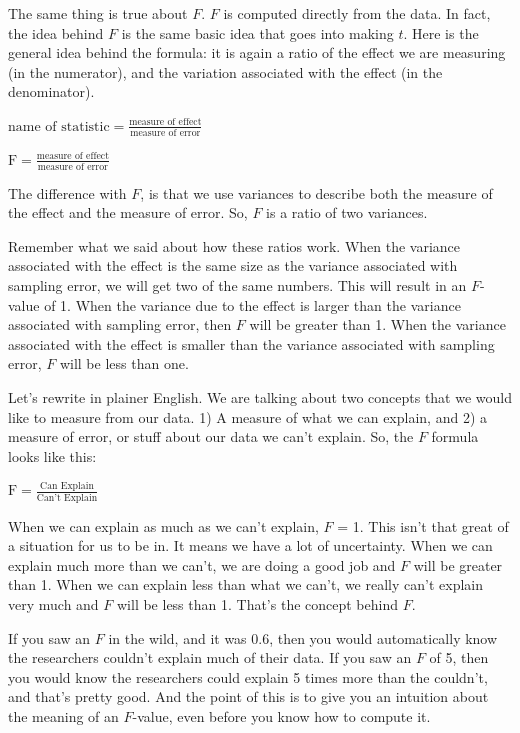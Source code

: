 \documentclass[
]{book}
\begin{document}
The same thing is true about \(F\). \(F\) is computed directly from the data. In fact, the idea behind \(F\) is the same basic idea that goes into making \(t\). Here is the general idea behind the formula: it is again a ratio of the effect we are measuring (in the numerator), and the variation associated with the effect (in the denominator).

\(\text{name of statistic} = \frac{\text{measure of effect}}{\text{measure of error}}\)

\(\text{F} = \frac{\text{measure of effect}}{\text{measure of error}}\)

The difference with \(F\), is that we use variances to describe both the measure of the effect and the measure of error. So, \(F\) is a ratio of two variances.

Remember what we said about how these ratios work. When the variance associated with the effect is the same size as the variance associated with sampling error, we will get two of the same numbers. This will result in an \(F\)-value of 1. When the variance due to the effect is larger than the variance associated with sampling error, then \(F\) will be greater than 1. When the variance associated with the effect is smaller than the variance associated with sampling error, \(F\) will be less than one.

Let's rewrite in plainer English. We are talking about two concepts that we would like to measure from our data. 1) A measure of what we can explain, and 2) a measure of error, or stuff about our data we can't explain. So, the \(F\) formula looks like this:

\(\text{F} = \frac{\text{Can Explain}}{\text{Can't Explain}}\)

When we can explain as much as we can't explain, \(F\) = 1. This isn't that great of a situation for us to be in. It means we have a lot of uncertainty. When we can explain much more than we can't, we are doing a good job and \(F\) will be greater than 1. When we can explain less than what we can't, we really can't explain very much and \(F\) will be less than 1. That's the concept behind \(F\).

If you saw an \(F\) in the wild, and it was 0.6, then you would automatically know the researchers couldn't explain much of their data. If you saw an \(F\) of 5, then you would know the researchers could explain 5 times more than the couldn't, and that's pretty good. And the point of this is to give you an intuition about the meaning of an \(F\)-value, even before you know how to compute it.
\end{document}
